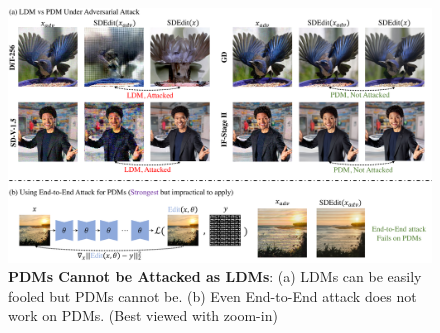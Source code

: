 \begin{figure}[t]
  \centering
\includegraphics[width=0.99\linewidth]{images/attack.pdf}
  \caption{\textbf{PDMs Cannot be Attacked as LDMs}: (a) LDMs can be easily fooled but PDMs cannot be. (b) Even End-to-End attack does not work on PDMs. (Best viewed with zoom-in)}

  \label{fig:attack_various_models}
  \vspace{-0.4cm}
\end{figure}
